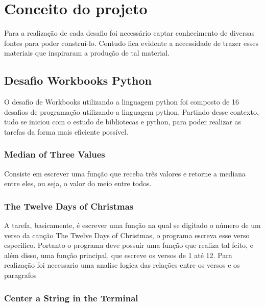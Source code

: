 \chapter{Conceito do projeto}
\label{chap:fundteor}

Para a realização de cada desafio foi necessário captar conhecimento de diversas fontes para poder construí-lo. Contudo fica evidente a necessidade de trazer esses materiais que inspiraram a produção de tal material.


\section{Desafio Workbooks Python}

O desafio de Workbooks utilizando a linguagem python foi composto de 16 desafios de programação utilizando a linguagem python. Partindo desse contexto, tudo se iniciou com o estudo de bibliotecas e python, para poder realizar as tarefas da forma mais eficiente possível.

\subsection{Median of Three Values}

Consiste em escrever uma função que receba três valores e retorne a mediana entre eles, ou seja, o valor do meio entre todos.

\subsection{The Twelve Days of Christmas}

A tarefa, basicamente, é escrever uma função na qual se digitado o número de um verso da canção The Twelve Days of Christmas, o programa escreva esse verso especifico. Portanto o programa deve possuir uma função que realiza tal feito, e além disso, uma função principal, que escreve os versos de 1 até 12. Para realização foi necessario uma analise logica das relações entre os versos e os paragrafos

\subsection{Center a String in the Terminal}


